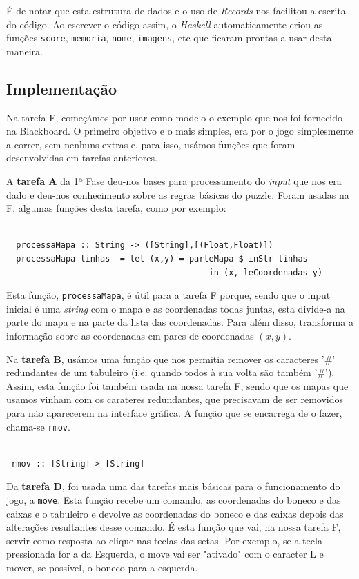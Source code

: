 \documentclass[a4paper]{article}
\begin{document}
É de notar que esta estrutura de dados e o uso de \emph{Records} nos facilitou a escrita do código. Ao escrever o código assim, o \emph{Haskell} automaticamente criou as funções \texttt{score}, \texttt{memoria}, \texttt{nome}, \texttt{imagens}, etc que ficaram prontas a usar desta maneira.


\subsection{Implementação}
Na tarefa F, começámos por usar como modelo o exemplo que nos foi fornecido na Blackboard. O primeiro objetivo e o mais simples, era por o jogo simplesmente a correr, sem nenhuns extras e, para isso, usámos funções que foram desenvolvidas em tarefas anteriores.

A \textbf{tarefa A} da 1ª Fase deu-nos bases para processamento do \emph{input} que nos era dado e deu-nos conhecimento sobre as regras básicas do puzzle. Foram usadas na F, algumas funções desta tarefa, como por exemplo:

\begin{Verbatim}

  processaMapa :: String -> ([String],[(Float,Float)])
  processaMapa linhas  = let (x,y) = parteMapa $ inStr linhas
                                         in (x, leCoordenadas y)

\end{Verbatim}

Esta função, \texttt{processaMapa}, é útil para a tarefa F porque, sendo que o input inicial é uma \emph{string} com o mapa e as coordenadas todas juntas, esta divide-a na parte do mapa e na parte da lista das coordenadas. Para além disso, transforma a informação sobre as coordenadas em pares de coordenadas $(x,y)$.

Na \textbf{tarefa B}, usámos uma função que nos permitia remover os caracteres '\#' redundantes de um tabuleiro (i.e. quando todos à sua volta são também ’\#’). Assim, esta função foi também usada na nossa tarefa F, sendo que os mapas que usamos vinham com os carateres redundantes, que precisavam de ser removidos para não aparecerem na interface gráfica. A função que se encarrega de o fazer, chama-se \texttt{rmov}.

\begin{Verbatim}

 rmov :: [String]-> [String]

\end{Verbatim}


Da \textbf{tarefa D}, foi usada uma das tarefas mais básicas para o funcionamento do jogo, a \texttt{move}. Esta função recebe um comando, as coordenadas do boneco e das caixas e o tabuleiro e devolve as coordenadas do boneco e das caixas depois das alterações resultantes desse comando. É esta função que vai, na nossa tarefa F, servir como resposta ao clique nas teclas das setas. Por exemplo, se a tecla pressionada for a da Esquerda, o move vai ser "ativado" com o caracter L e mover, se possível, o boneco para a esquerda.
\end{document}
